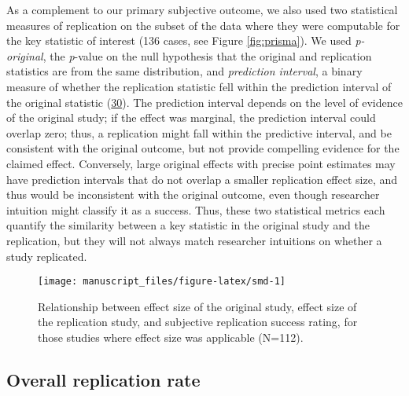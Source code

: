 \documentclass[
  english,
  a4paper,
]{article}
\begin{document}
As a complement to our primary subjective outcome, we also used two statistical measures of replication on the subset of the data where they were computable for the key statistic of interest (136 cases, see Figure \ref{fig:prisma}). We used \emph{p-original}, the \emph{p}-value on the null hypothesis that the original and replication statistics are from the same distribution, and \emph{prediction interval}, a binary measure of whether the replication statistic fell within the prediction interval of the original statistic (\protect\hyperlink{ref-mathur2020}{30}). The prediction interval depends on the level of evidence of the original study; if the effect was marginal, the prediction interval could overlap zero; thus, a replication might fall within the predictive interval, and be consistent with the original outcome, but not provide compelling evidence for the claimed effect. Conversely, large original effects with precise point estimates may have prediction intervals that do not overlap a smaller replication effect size, and thus would be inconsistent with the original outcome, even though researcher intuition might classify it as a success. Thus, these two statistical metrics each quantify the similarity between a key statistic in the original study and the replication, but they will not always match researcher intuitions on whether a study replicated.

\begin{figure}[ht]
\texttt{[image: manuscript\_files/figure-latex/smd-1]} \caption{Relationship between effect size of the original study, effect size of the replication study, and subjective replication success rating, for those studies where effect size was applicable (N=112).}\label{fig:smd}
\end{figure}

\hypertarget{overall-replication-rate}{%
\subsection{Overall replication rate}\label{overall-replication-rate}}
\end{document}
